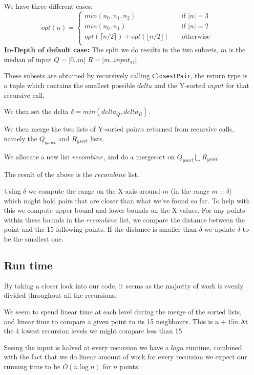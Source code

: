 \documentclass{tufte-handout}
\begin{document}
We have three different cases:\newline \bigskip
\[opt(n) = 
\begin{cases}
    min(n_0, n_1, n_2)       & \quad \text{if  } |n| = 3\\
    min(n_0, n_1) & \quad \text{if } |n| = 2 \\
    opt( \lceil n/2 \rceil ) + opt( \lfloor n/2 \rfloor ) & \quad \text{otherwise} \\
  \end{cases}\] \newline
  \bigskip
\textbf{In-Depth of default case:}\newline
The split we do results in the two subsets, $m$ is the median of input\newline
  $Q = \lbrack 0 .. m \lbrack $\newline
  $R = \lbrack m .. input_{sz} \lbrack$ \newline 

These subsets are obtained by recursively calling \verb+ClosestPair+, the return type is a tuple which contains the smallest possible $delta$ and the Y-sorted $input$ for that recursive call.

We then set the delta $\delta = min(delta_{Q}, delta_{R})$.\newline

We then merge the two lists of Y-sorted points returned from recursive calls, namely the $Q_{ysort}$ and $R_{ysort}$ lists.

We allocate a new list $recombine$, and do a mergesort on \newline $Q_{y sort} \bigcup R_{y sort}$.


The result of the above is the $recombine$ list.\newline

Using $\delta$ we compute the range on the X-axis around $m$ (in the range $m \pm \delta$) which might hold pairs that are closer than what we've found so far.
To help with this we compute upper bound and lower bounds on the X-values.\newline
For any points within these bounds in the $recombine$ list, we compare the distance between the point and the 15 following points.
If the distance is smaller than $\delta$ we update $\delta$ to be the smallest one.

\subsection{Run time}
By taking a closer look into our code, it seems as the majority of work is evenly divided throughout all the recursions.

We seem to spend linear time at each level during the merge of the sorted lists, and linear time to compare a given point to its 15 neighbours.
This is $n + 15n$.\newline At the 4 lowest recursion levels we might compare less than 15.

Seeing the input is halved at every recursion we have a $log n$ runtime, combined with the fact that we do linear amount of work for every recursion we expect our running time to be $O(n\log n)$ for $n$ points.
\end{document}
